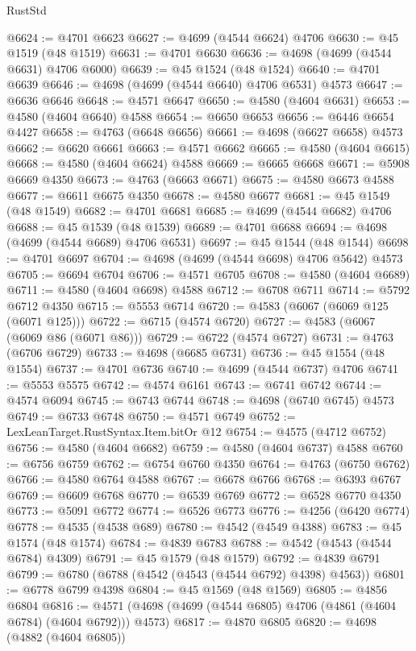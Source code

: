 \begin{lexlean}{RustStd}
\begin{coremodule}
@6624 := @4701 @6623
@6627 := @4699 (@4544 @6624) @4706
@6630 := @45 @1519 (@48 @1519)
@6631 := @4701 @6630
@6636 := @4698 (@4699 (@4544 @6631) @4706 @6000)
@6639 := @45 @1524 (@48 @1524)
@6640 := @4701 @6639
@6646 := @4698 (@4699 (@4544 @6640) @4706 @6531) @4573
@6647 := @6636 @6646
@6648 := @4571 @6647
@6650 := @4580 (@4604 @6631)
@6653 := @4580 (@4604 @6640) @4588
@6654 := @6650 @6653
@6656 := @6446 @6654 @4427
@6658 := @4763 (@6648 @6656)
@6661 := @4698 (@6627 @6658) @4573
@6662 := @6620 @6661
@6663 := @4571 @6662
@6665 := @4580 (@4604 @6615)
@6668 := @4580 (@4604 @6624) @4588
@6669 := @6665 @6668
@6671 := @5908 @6669 @4350
@6673 := @4763 (@6663 @6671)
@6675 := @4580 @6673 @4588
@6677 := @6611 @6675 @4350
@6678 := @4580 @6677
@6681 := @45 @1549 (@48 @1549)
@6682 := @4701 @6681
@6685 := @4699 (@4544 @6682) @4706
@6688 := @45 @1539 (@48 @1539)
@6689 := @4701 @6688
@6694 := @4698 (@4699 (@4544 @6689) @4706 @6531)
@6697 := @45 @1544 (@48 @1544)
@6698 := @4701 @6697
@6704 := @4698 (@4699 (@4544 @6698) @4706 @5642) @4573
@6705 := @6694 @6704
@6706 := @4571 @6705
@6708 := @4580 (@4604 @6689)
@6711 := @4580 (@4604 @6698) @4588
@6712 := @6708 @6711
@6714 := @5792 @6712 @4350
@6715 := @5553 @6714
@6720 := @4583 (@6067 (@6069 @125 (@6071 @125)))
@6722 := @6715 (@4574 @6720)
@6727 := @4583 (@6067 (@6069 @86 (@6071 @86)))
@6729 := @6722 (@4574 @6727)
@6731 := @4763 (@6706 @6729)
@6733 := @4698 (@6685 @6731)
@6736 := @45 @1554 (@48 @1554)
@6737 := @4701 @6736
@6740 := @4699 (@4544 @6737) @4706
@6741 := @5553 @5575
@6742 := @4574 @6161
@6743 := @6741 @6742
@6744 := @4574 @6094
@6745 := @6743 @6744
@6748 := @4698 (@6740 @6745) @4573
@6749 := @6733 @6748
@6750 := @4571 @6749
@6752 := LexLeanTarget.RustSyntax.Item.bitOr @12
@6754 := @4575 (@4712 @6752)
@6756 := @4580 (@4604 @6682)
@6759 := @4580 (@4604 @6737) @4588
@6760 := @6756 @6759
@6762 := @6754 @6760 @4350
@6764 := @4763 (@6750 @6762)
@6766 := @4580 @6764 @4588
@6767 := @6678 @6766
@6768 := @6393 @6767
@6769 := @6609 @6768
@6770 := @6539 @6769
@6772 := @6528 @6770 @4350
@6773 := @5091 @6772
@6774 := @6526 @6773
@6776 := @4256 (@6420 @6774)
@6778 := @4535 (@4538 @689)
@6780 := @4542 (@4549 @4388)
@6783 := @45 @1574 (@48 @1574)
@6784 := @4839 @6783
@6788 := @4542 (@4543 (@4544 @6784) @4309)
@6791 := @45 @1579 (@48 @1579)
@6792 := @4839 @6791
@6799 := @6780 (@6788 (@4542 (@4543 (@4544 @6792) @4398) @4563))
@6801 := @6778 @6799 @4398
@6804 := @45 @1569 (@48 @1569)
@6805 := @4856 @6804
@6816 := @4571 (@4698 (@4699 (@4544 @6805) @4706 (@4861 (@4604 @6784) (@4604 @6792))) @4573)
@6817 := @4870 @6805
@6820 := @4698 (@4882 (@4604 @6805))

\end{coremodule}
\end{lexlean}
